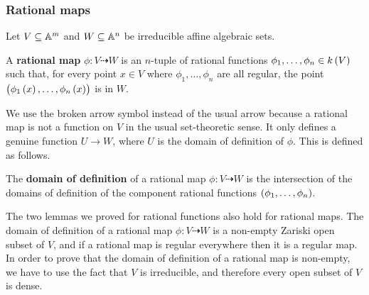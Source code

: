 \subsubsection{Rational maps}

Let $ V \subseteq \AA^m $ and $ W \subseteq \AA^n $ be irreducible affine algebraic sets.

\begin{definition*}
A \textbf{rational map} $ \phi : V \dashrightarrow W $ is an $ n $-tuple of rational functions $ \phi_1, \dots, \phi_n \in k\br{V} $ such that, for every point $ x \in V $ where $ \phi_1, \dots, \phi_n $ are all regular, the point $ \br{\phi_1\br{x}, \dots, \phi_n\br{x}} $ is in $ W $.
\end{definition*}

We use the broken arrow symbol instead of the usual arrow because a rational map is not a function on $ V $ in the usual set-theoretic sense. It only defines a genuine function $ U \to W $, where $ U $ is the domain of definition of $ \phi $. This is defined as follows.

\begin{definition*}
The \textbf{domain of definition} of a rational map $ \phi : V \dashrightarrow W $ is the intersection of the domains of definition of the component rational functions $ \br{\phi_1, \dots, \phi_n} $.
\end{definition*}

The two lemmas we proved for rational functions also hold for rational maps. The domain of definition of a rational map $ \phi : V \dashrightarrow W $ is a non-empty Zariski open subset of $ V $, and if a rational map is regular everywhere then it is a regular map. In order to prove that the domain of definition of a rational map is non-empty, we have to use the fact that $ V $ is irreducible, and therefore every open subset of $ V $ is dense.

